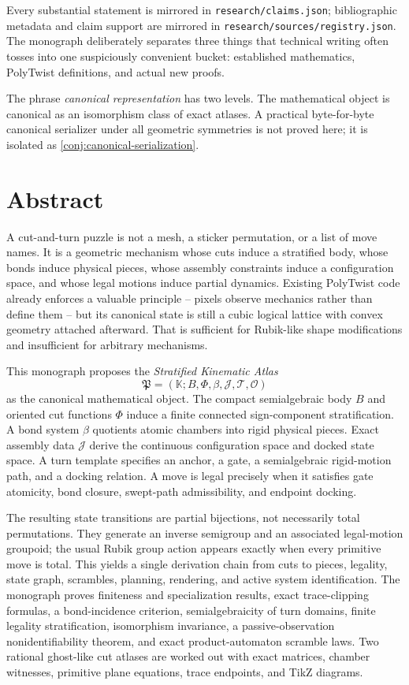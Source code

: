 \documentclass[11pt,openany]{book}
\newcommand{\K}{\mathbb K}
\newcommand{\Atlas}{\mathfrak P}
\newcommand{\Turns}{\mathcal T}
\theoremstyle{polyplain}
\theoremstyle{polydef}
\begin{document}
Every substantial statement is mirrored in \texttt{research/claims.json}; bibliographic metadata and claim support are mirrored in \texttt{research/sources/registry.json}. The monograph deliberately separates three things that technical writing often tosses into one suspiciously convenient bucket: established mathematics, PolyTwist definitions, and actual new proofs.

\begin{warningbox}
The phrase \emph{canonical representation} has two levels. The mathematical object is canonical as an isomorphism class of exact atlases. A practical byte-for-byte canonical serializer under all geometric symmetries is not proved here; it is isolated as \cref{conj:canonical-serialization}.
\end{warningbox}

\chapter*{Abstract}

A cut-and-turn puzzle is not a mesh, a sticker permutation, or a list of move names. It is a geometric mechanism whose cuts induce a stratified body, whose bonds induce physical pieces, whose assembly constraints induce a configuration space, and whose legal motions induce partial dynamics. Existing PolyTwist code already enforces a valuable principle -- pixels observe mechanics rather than define them -- but its canonical state is still a cubic logical lattice with convex geometry attached afterward. That is sufficient for Rubik-like shape modifications and insufficient for arbitrary mechanisms.

This monograph proposes the \emph{Stratified Kinematic Atlas}
\[
\Atlas=(\K;B,\Phi,\beta,\mathcal J,\Turns,\mathcal O)
\]
as the canonical mathematical object. The compact semialgebraic body $B$ and oriented cut functions $\Phi$ induce a finite connected sign-component stratification. A bond system $\beta$ quotients atomic chambers into rigid physical pieces. Exact assembly data $\mathcal J$ derive the continuous configuration space and docked state space. A turn template specifies an anchor, a gate, a semialgebraic rigid-motion path, and a docking relation. A move is legal precisely when it satisfies gate atomicity, bond closure, swept-path admissibility, and endpoint docking.

The resulting state transitions are partial bijections, not necessarily total permutations. They generate an inverse semigroup and an associated legal-motion groupoid; the usual Rubik group action appears exactly when every primitive move is total. This yields a single derivation chain from cuts to pieces, legality, state graph, scrambles, planning, rendering, and active system identification. The monograph proves finiteness and specialization results, exact trace-clipping formulas, a bond-incidence criterion, semialgebraicity of turn domains, finite legality stratification, isomorphism invariance, a passive-observation nonidentifiability theorem, and exact product-automaton scramble laws. Two rational ghost-like cut atlases are worked out with exact matrices, chamber witnesses, primitive plane equations, trace endpoints, and TikZ diagrams.
\end{document}

